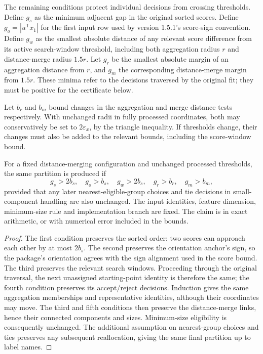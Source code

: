 The remaining conditions protect individual decisions from crossing thresholds. Define $g_s$ as the minimum adjacent gap in the original sorted scores. Define $g_o=|u^{\mathsf T}x_1|$ for the first input row used by version 1.5.1's score-sign convention. Define $g_w$ as the smallest absolute distance of any relevant score difference from its active search-window threshold, including both aggregation radius $r$ and distance-merge radius $1.5r$. Let $g_r$ be the smallest absolute margin of an aggregation distance from $r$, and $g_m$ the corresponding distance-merge margin from $1.5r$. These minima refer to the decisions traversed by the original fit; they must be positive for the certificate below.

Let $b_r$ and $b_m$ bound changes in the aggregation and merge distance tests respectively. With unchanged radii in fully processed coordinates, both may conservatively be set to $2\varepsilon_x$, by the triangle inequality. If thresholds change, their changes must also be added to the relevant bounds, including the score-window bound.

\begin{proposition}
\label{prop:local}
For a fixed distance-merging configuration and unchanged processed thresholds, the same partition is produced if
\[
 g_s>2b_s,\quad g_o>b_s,\quad g_w>2b_s,
 \quad g_r>b_r,\quad g_m>b_m,
\]
provided that any later nearest-eligible-group choices and tie decisions in small-component handling are also unchanged. The input identities, feature dimension, minimum-size rule and implementation branch are fixed. The claim is in exact arithmetic, or with numerical error included in the bounds.
\end{proposition}
\begin{proof}
The first condition preserves the sorted order: two scores can approach each other by at most $2b_s$. The second preserves the orientation anchor's sign, so the package's orientation agrees with the sign alignment used in the score bound. The third preserves the relevant search windows. Proceeding through the original traversal, the next unassigned starting-point identity is therefore the same; the fourth condition preserves its accept/reject decisions. Induction gives the same aggregation memberships and representative identities, although their coordinates may move. The third and fifth conditions then preserve the distance-merge links, hence their connected components and sizes. Minimum-size eligibility is consequently unchanged. The additional assumption on nearest-group choices and ties preserves any subsequent reallocation, giving the same final partition up to label names.
\end{proof}

